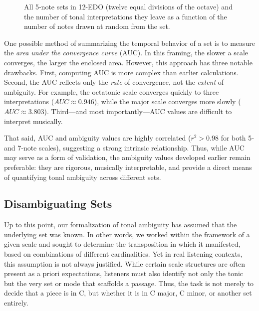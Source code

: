 \documentclass[10pt,twocolumn]{article}
\numberwithin{equation}{section} %
\begin{document}
    \begin{figure}[htbp]
        \centering
        \caption{All 5‑note sets in 12-EDO (twelve equal divisions of the octave) and the number of tonal interpretations they leave as a function of the number of notes drawn at random from the set.}
        \label{fig:time}
    \end{figure}

    One possible method of summarizing the temporal behavior of a set is to measure the \textit{area under the convergence curve} (AUC).
    In this framing, the slower a scale converges, the larger the enclosed area.
    However, this approach has three notable drawbacks.
    First, computing AUC is more complex than earlier calculations.
    Second, the AUC reflects only the \textit{rate} of convergence, not the \textit{extent} of ambiguity.
    For example, the octatonic scale converges quickly to three interpretations ($AUC \approx 0.946$), while the major scale converges more slowly ($AUC \approx 3.803$).
    Third—and most importantly—AUC values are difficult to interpret musically.

    That said, AUC and ambiguity values are highly correlated ($r^2 > 0.98$ for both 5‑ and 7‑note scales), suggesting a strong intrinsic relationship.
    Thus, while AUC may serve as a form of validation, the ambiguity values developed earlier remain preferable: they are rigorous, musically interpretable, and provide a direct means of quantifying tonal ambiguity across different sets.

    \subsection{Disambiguating Sets}

    Up to this point, our formalization of tonal ambiguity has assumed that the underlying set was known.
    In other words, we worked within the framework of a given scale and sought to determine the transposition in which it manifested, based on combinations of different cardinalities.
    Yet in real listening contexts, this assumption is not always justified.
    While certain scale structures are often present as a priori expectations\citep{Krumhansl1979}, listeners must also identify not only the tonic but the very set or mode that scaffolds a passage.
    Thus, the task is not merely to decide that a piece is in C, but whether it is in C major, C minor, or another set entirely.
\end{document}
